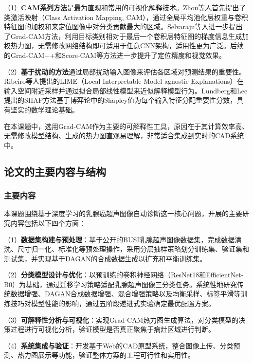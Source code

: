（1）\textbf{CAM系列方法}是最为直观和常用的可视化解释技术。Zhou等人\cite{zhou2016learning}首先提出了类激活映射（Class Activation Mapping, CAM），通过全局平均池化层权重与卷积特征图的加权和来定位图像中对分类贡献最大的区域。Selvaraju等人\cite{selvaraju2017grad}进一步提出了Grad-CAM方法，利用目标类别相对于最后一个卷积层特征图的梯度信息生成加权热力图，无需修改网络结构即可适用于任意CNN架构，适用性更为广泛。后续的Grad-CAM++\cite{chattopadhay2018grad}和Score-CAM\cite{wang2020score}等方法进一步提升了定位精度和视觉效果。

（2）\textbf{基于扰动的方法}通过局部扰动输入图像来评估各区域对预测结果的重要性。Ribeiro等人\cite{ribeiro2016should}提出的LIME（Local Interpretable Model-agnostic Explanations）在输入空间附近采样并通过拟合局部线性模型来近似解释模型行为。Lundberg和Lee\cite{lundberg2017unified}提出的SHAP方法基于博弈论中的Shapley值为每个输入特征分配重要性分数，具有坚实的数学理论基础。

在本课题中，选用Grad-CAM作为主要的可解释性工具，原因在于其计算效率高、无需修改模型结构、生成的热力图直观易理解，非常适合集成到实时的CAD系统中。


\subsection{论文的主要内容与结构}

\subsubsection{主要内容}

本课题围绕基于深度学习的乳腺癌超声图像自动诊断这一核心问题，开展的主要研究内容包括以下四个方面：

（1）\textbf{数据集构建与预处理}：基于公开的BUSI乳腺超声图像数据集，完成数据清洗、尺寸归一化、标准化等预处理操作，采用分层抽样策略划分训练集、验证集和测试集，并实现基于DAGAN的合成数据生成以扩充和平衡训练集。

（2）\textbf{分类模型设计与优化}：以预训练的卷积神经网络（ResNet18和EfficientNet-B0）为基础，通过迁移学习策略适配乳腺超声图像三分类任务。系统性地研究传统数据增强、DAGAN合成数据增强、混合增强策略以及均衡采样、标签平滑等训练技巧对模型性能的影响，通过五阶段递进式实验确定最优配置方案。

（3）\textbf{可解释性分析与可视化}：实现Grad-CAM热力图生成算法，对分类模型的决策过程进行可视化分析，验证模型是否真正聚焦于病灶区域进行判断。

（4）\textbf{系统集成与验证}：开发基于Web的CAD原型系统，整合图像上传、分类预测、热力图展示等功能，验证整体方案的工程可行性和实用性。

